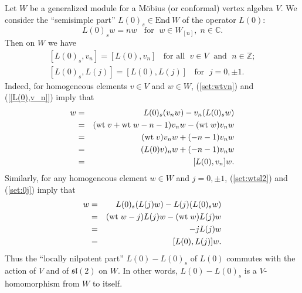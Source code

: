 \documentclass[12pt]{article}
\begin{document}
\begin{rema}\label{set:L(0)s}{\rm
Let $W$ be a generalized module for a M\"obius (or conformal) vertex
algebra $V$.  We consider the ``semisimple part'' $L(0)_s\in
\mbox{End}\ W$ of the operator $L(0)$:
\[
L(0)_sw=nw \;\; \mbox{ for } \; w\in W_{[n]},\; n \in {\mathbb C}.
\]
Then on $W$ we have
\begin{eqnarray}
&{}[L(0)_s, v_n]=[L(0), v_n]\;\;\mbox{ for all }\;v\in V\;\mbox{ and }
\; n\in {\mathbb Z};&\label{L0s,vn}\\
&{}[L(0)_s, L(j)]=[L(0), L(j)]\;\;\mbox{ for }\; j=0,\pm 1.
&\label{L0s,Lj}
\end{eqnarray}
Indeed, for homogeneous elements $v\in V$ and $w\in W$,
(\ref{set:wtvn}) and (\ref{[L(0),v_n]}) imply that
\begin{eqnarray*}
[L(0)_s, v_n]w&=&L(0)_s(v_nw)-v_n(L(0)_sw)\\
&=&(\wt v +\wt w-n-1)v_nw-(\wt w)v_nw\\
&=&(\wt v)v_nw+(-n-1)v_nw\\
&=&(L(0)v)_nw+(-n-1)v_nw\\
&=&[L(0), v_n]w.
\end{eqnarray*}
Similarly, for any homogeneous element $w\in W$ and $j=0,\pm 1$,
(\ref{set:wtsl2}) and (\ref{set:0j}) imply that
\begin{eqnarray*}
[L(0)_s, L(j)]w&=&L(0)_s(L(j)w)-L(j)(L(0)_sw)\\
&=&(\wt w-j)L(j)w-(\wt w)L(j)w\\
&=&-jL(j)w\\
&=&[L(0), L(j)]w.
\end{eqnarray*}
Thus the ``locally nilpotent part'' $L(0)-L(0)_s$ of $L(0)$ commutes
with the action of $V$ and of ${\mathfrak s}{\mathfrak l}(2)$ on $W$.  In
other words, $L(0)-L(0)_s$ is a $V$-homomorphism {}from $W$ to itself.}
\end{rema}
\end{document}
